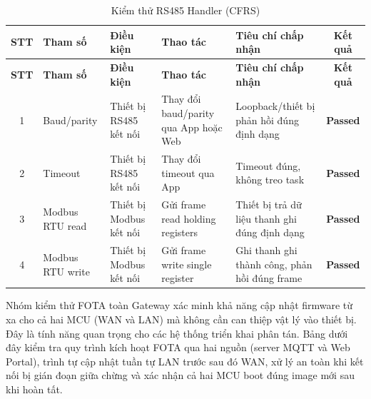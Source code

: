         \begin{longtable}{|c|p{2cm}|p{2.5cm}|p{3.5cm}|p{4cm}|c|}
            \caption{Kiểm thử RS485 Handler (CFRS)}
            \label{tab:test_rs485_handler} \\
            \hline
            \textbf{STT} & \textbf{Tham số} & \textbf{Điều kiện} & \textbf{Thao tác} & \textbf{Tiêu chí chấp nhận} & \textbf{Kết quả} \\ \hline
            \endfirsthead
            \hline
            \textbf{STT} & \textbf{Tham số} & \textbf{Điều kiện} & \textbf{Thao tác} & \textbf{Tiêu chí chấp nhận} & \textbf{Kết quả} \\ \hline
            \endhead
            \hline
            \endfoot
            \endlastfoot

            1 & Baud/parity & Thiết bị RS485 kết nối & Thay đổi baud/parity qua App hoặc Web & Loopback/thiết bị phản hồi đúng định dạng & \textcolor{modern_blue}{\textbf{Passed}} \\ \hline
            2 & Timeout & Thiết bị RS485 kết nối & Thay đổi timeout qua App & Timeout đúng, không treo task & \textcolor{modern_blue}{\textbf{Passed}} \\ \hline
            3 & Modbus RTU read & Thiết bị Modbus kết nối & Gửi frame read holding registers & Thiết bị trả dữ liệu thanh ghi đúng định dạng & \textcolor{modern_blue}{\textbf{Passed}} \\ \hline
            4 & Modbus RTU write & Thiết bị Modbus kết nối & Gửi frame write single register & Ghi thanh ghi thành công, phản hồi đúng frame & \textcolor{modern_blue}{\textbf{Passed}} \\ \hline
        \end{longtable}

        Nhóm kiểm thử FOTA toàn Gateway xác minh khả năng cập nhật firmware từ xa cho cả hai MCU (WAN và LAN) mà không cần can thiệp vật lý vào thiết bị. Đây là tính năng quan trọng cho các hệ thống triển khai phân tán. Bảng dưới đây kiểm tra quy trình kích hoạt FOTA qua hai nguồn (server MQTT và Web Portal), trình tự cập nhật tuần tự LAN trước sau đó WAN, xử lý an toàn khi kết nối bị gián đoạn giữa chừng và xác nhận cả hai MCU boot đúng image mới sau khi hoàn tất.

